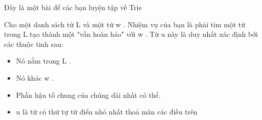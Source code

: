 Đây là một bài để các bạn luyện tập về Trie     

   Cho một danh sách từ       L      và một từ       w      . Nhiệm vụ của bạn là phải tìm một từ trong       L      tạo thành một "vần hoàn hảo" với       w      . Từ       u      này là duy nhất xác định bởi các thuộc tinh sau:  
\begin{itemize}
	\item      Nó nằm trong           L          .    
	\item      Nó khác           w          .    
	\item      Phần hậu tố chung của chúng dài nhất có thể.    
	\item            u          là từ có thứ tự từ điển nhỏ nhất thoả mãn các điều trên    
\end{itemize}